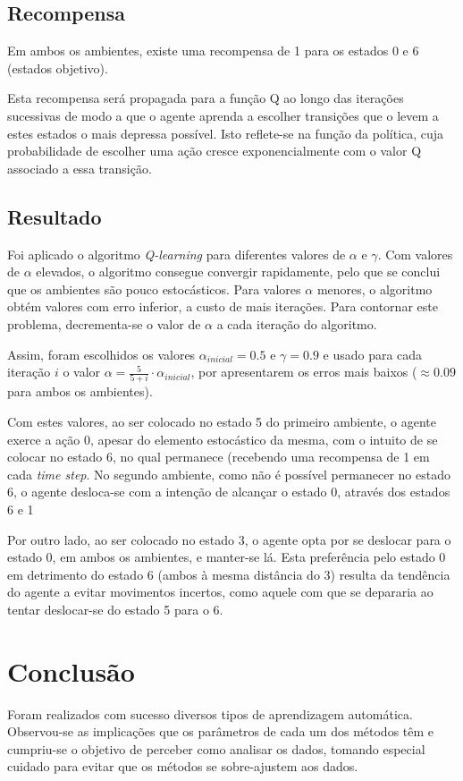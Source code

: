 \documentclass[twocolumn, 9pt]{extarticle}
\begin{document}
\subsection{Recompensa}

Em ambos os ambientes, existe uma recompensa de 1 para os estados 0 e 6 (estados objetivo).\par
Esta recompensa será propagada para a função Q ao longo das iterações sucessivas de modo a que o agente aprenda a escolher transições que o levem a estes estados o mais depressa possível. Isto reflete-se na função da política, cuja probabilidade de escolher uma ação cresce exponencialmente com o valor Q associado a essa transição.\par

\subsection{Resultado}
Foi aplicado o algoritmo \textit{Q-learning} para diferentes valores de $\alpha$ e $\gamma$. Com valores de $\alpha$ elevados, o algoritmo consegue convergir rapidamente, pelo que se conclui que os ambientes são pouco estocásticos. Para valores $\alpha$ menores, o algoritmo obtém valores com erro inferior, a custo de mais iterações. Para contornar este problema, decrementa-se o valor de $\alpha$ a cada iteração do algoritmo.\par
Assim, foram escolhidos os valores ${\alpha_{inicial} = 0.5}$ e ${\gamma = 0.9}$ e usado para cada iteração $i$ o valor ${\alpha = \frac{5}{5+i} \cdot \alpha_{inicial}}$, por apresentarem os erros mais baixos ($\approx 0.09$ para ambos os ambientes).\par
Com estes valores, ao ser colocado no estado 5 do primeiro ambiente, o agente exerce a ação 0, apesar do elemento estocástico da mesma, com o intuito de se colocar no estado 6, no qual permanece (recebendo uma recompensa de 1 em cada \textit{time step}. No segundo ambiente, como não é possível permanecer no estado 6, o agente desloca-se com a intenção de alcançar o estado 0, através dos estados 6 e 1\par
Por outro lado, ao ser colocado no estado 3, o agente opta por se deslocar para o estado 0, em ambos os ambientes, e manter-se lá. Esta preferência pelo estado 0 em detrimento do estado 6 (ambos à mesma distância do 3) resulta da tendência do agente a evitar movimentos incertos, como aquele com que se depararia ao tentar deslocar-se do estado 5 para o 6.\par

\section{Conclusão}
Foram realizados com sucesso diversos tipos de aprendizagem automática. Observou-se as implicações que os parâmetros de cada um dos métodos têm e cumpriu-se o objetivo de perceber como analisar os dados, tomando especial cuidado para evitar que os métodos se sobre-ajustem aos dados.\par
\end{document}
